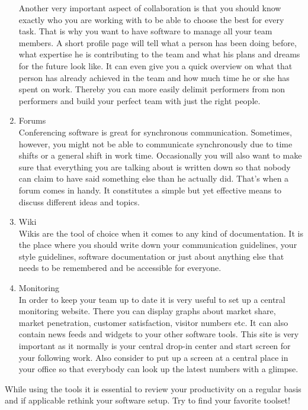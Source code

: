 \begin{multicols}{2}
\begin{enumerate}[1.]
Another very important aspect of collaboration is that you should know exactly who you are working with to be able to choose the best for every task. That is why you want to have software to manage all your team members. A short profile page will tell what a person has been doing before, what expertise he is contributing to the team and what his plans and dreams for the future look like.
It can even give you a quick overview on what that person has already achieved in the team and how much time he or she has spent on work. Thereby you can more easily delimit performers from non performers and build your perfect team with just the right people.
	\item Forums\\
Conferencing software is great for synchronous communication. Sometimes, however, you might not be able to communicate synchronously due to time shifts or a general shift in work time. Occasionally you will also want to make sure that everything you are talking about is written down so that nobody can claim to have said something else than he actually did. That’s when a forum comes in handy.
It constitutes a simple but yet effective means to discuss different ideas and topics.
	\item Wiki\\
Wikis are the tool of choice when it comes to any kind of documentation. It is the place where you should write down your communication guidelines, your style guidelines, software documentation or just about anything else that needs to be remembered and be accessible for everyone.
	\item Monitoring\\
In order to keep your team up to date it is very useful to set up a central monitoring website. There you can display graphs about market share, market penetration, customer satisfaction, visitor numbers etc. It can also contain news feeds and widgets to your other software tools. This site is very important as it normally is your central drop-in center and start screen for your following work. Also consider to put up a screen at a central place in your office so that everybody can look up the latest numbers with a glimpse.
\end{enumerate}

While using the tools it is essential to review your productivity on a regular basis and if applicable rethink your software setup. Try to find your favorite toolset!
\end{multicols}